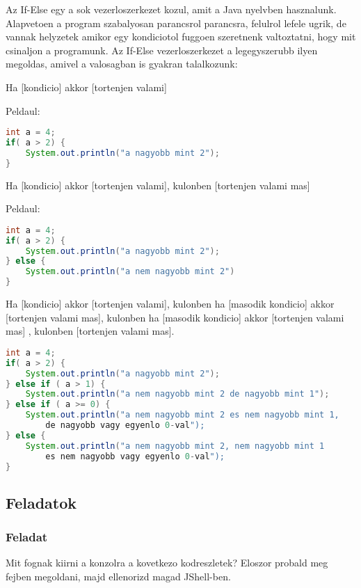 \documentclass{article}
\begin{document}
Az If-Else egy a sok vezerloszerkezet kozul, amit a Java nyelvben hasznalunk. Alapvetoen a program szabalyosan parancsrol parancsra, felulrol lefele ugrik, de vannak helyzetek amikor egy kondiciotol fuggoen szeretnenk valtoztatni, hogy mit csinaljon a programunk. Az If-Else vezerloszerkezet a legegyszerubb ilyen megoldas, amivel a valosagban is gyakran talalkozunk:

Ha [kondicio] akkor [tortenjen valami]

Peldaul:
\begin{lstlisting}[language=Java, caption=If hasznalata]
int a = 4;
if( a > 2) {
    System.out.println("a nagyobb mint 2");
}
\end{lstlisting}

Ha [kondicio] akkor [tortenjen valami], kulonben [tortenjen valami mas]

Peldaul:
\begin{lstlisting}[language=Java, caption=If hasznalata]
int a = 4;
if( a > 2) {
    System.out.println("a nagyobb mint 2");
} else {
    System.out.println("a nem nagyobb mint 2")
}
\end{lstlisting}

Ha [kondicio] akkor [tortenjen valami], kulonben ha [masodik kondicio] akkor [tortenjen valami mas],  kulonben ha [masodik kondicio] akkor [tortenjen valami mas] , kulonben [tortenjen valami mas].

\begin{lstlisting}[language=Java, caption=If hasznalata]
int a = 4;
if( a > 2) {
    System.out.println("a nagyobb mint 2");
} else if ( a > 1) {
    System.out.println("a nem nagyobb mint 2 de nagyobb mint 1");
} else if ( a >= 0) {
    System.out.println("a nem nagyobb mint 2 es nem nagyobb mint 1,
        de nagyobb vagy egyenlo 0-val");
} else {
    System.out.println("a nem nagyobb mint 2, nem nagyobb mint 1
        es nem nagyobb vagy egyenlo 0-val");
}
\end{lstlisting}

\subsection{Feladatok}

\subsubsection{Feladat}

Mit fognak kiirni a konzolra a kovetkezo kodreszletek? Eloszor probald meg fejben megoldani, majd ellenorizd magad JShell-ben.
\end{document}
